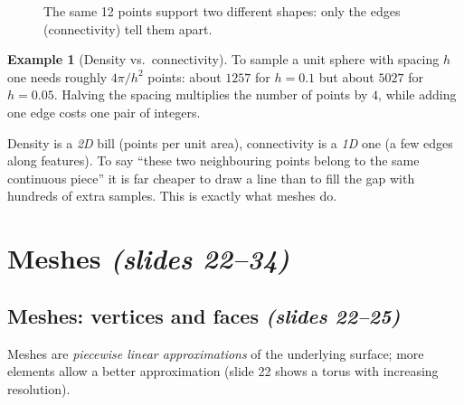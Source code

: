 \documentclass[11pt,a4paper]{article}
\theoremstyle{definition}
\newtheorem{example}[definition]{Example}
\theoremstyle{plain}
\theoremstyle{remark}
\newcommand{\slides}[1]{\texorpdfstring{\emph{(#1)}}{(#1)}}
\begin{document}
\begin{figure}[ht]
\centering
{}
\caption{The same 12 points support two different shapes: only the edges (connectivity) tell them apart.}
\end{figure}

\begin{example}[Density vs.\ connectivity]
To sample a unit sphere with spacing $h$ one needs roughly $4\pi/h^2$ points: about $1257$ for $h=0.1$ but about $5027$ for $h=0.05$. Halving the spacing multiplies the number of points by $4$, while adding one edge costs one pair of integers.
\end{example}

\begin{intuition}
Density is a \emph{2D} bill (points per unit area), connectivity is a \emph{1D} one (a few edges along features). To say ``these two neighbouring points belong to the same continuous piece'' it is far cheaper to draw a line than to fill the gap with hundreds of extra samples. This is exactly what meshes do.
\end{intuition}

\section{Meshes \slides{slides 22--34}}

\subsection{Meshes: vertices and faces \slides{slides 22--25}}
Meshes are \emph{piecewise linear approximations} of the underlying surface; more elements allow a better approximation (slide 22 shows a torus with increasing resolution).
\end{document}
